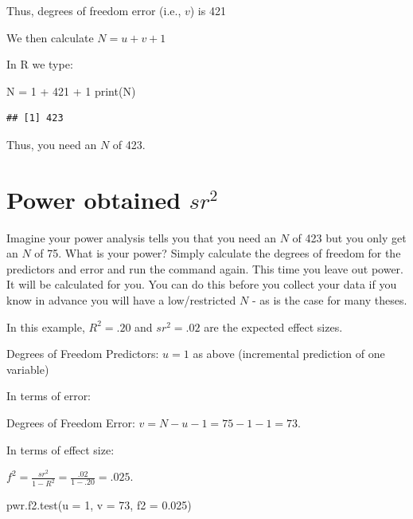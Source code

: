 \documentclass[
]{krantz}
\makeatletter
\newenvironment{Shaded}{\begin{snugshade}}{\end{snugshade}}
\newcommand{\AttributeTok}[1]{\textcolor[rgb]{0.61,0.61,0.61}{#1}}
\newcommand{\DecValTok}[1]{\textcolor[rgb]{0.06,0.06,0.06}{#1}}
\newcommand{\FloatTok}[1]{\textcolor[rgb]{0.06,0.06,0.06}{#1}}
\newcommand{\FunctionTok}[1]{\textcolor[rgb]{0,0,0}{#1}}
\newcommand{\NormalTok}[1]{#1}
\newcommand{\OtherTok}[1]{\textcolor[rgb]{0.37,0.37,0.37}{#1}}
\newcommand{\SpecialCharTok}[1]{\textcolor[rgb]{0,0,0}{#1}}
\newenvironment{kframe}{%
\medskip{}
\setlength{\fboxsep}{.8em}
 \def\at@end@of@kframe{}%
 \ifinner\ifhmode%
  \def\at@end@of@kframe{\end{minipage}}%
  \begin{minipage}{\columnwidth}%
 \fi\fi%
 \def\FrameCommand##1{\hskip\@totalleftmargin \hskip-\fboxsep
 \colorbox{shadecolor}{##1}\hskip-\fboxsep
     \hskip-\linewidth \hskip-\@totalleftmargin \hskip\columnwidth}%
 \MakeFramed {\advance\hsize-\width
   \@totalleftmargin\z@ \linewidth\hsize
   \@setminipage}}%
 {\par\unskip\endMakeFramed%
 \at@end@of@kframe}
\renewenvironment{Shaded}{\begin{kframe}}{\end{kframe}}
\makeatother
\begin{document}
Thus, degrees of freedom error (i.e., \(v\)) is 421

We then calculate \(N = u + v + 1\)

In R we type:

\begin{Shaded}
\begin{Highlighting}[]
\NormalTok{N }\OtherTok{=} \DecValTok{1} \SpecialCharTok{+} \DecValTok{421} \SpecialCharTok{+} \DecValTok{1}
\FunctionTok{print}\NormalTok{(N)}
\end{Highlighting}
\end{Shaded}

\begin{verbatim}
## [1] 423
\end{verbatim}

Thus, you need an \(N\) of 423.

\hypertarget{power-obtained-sr2}{%
\section{\texorpdfstring{Power obtained \(sr^2\)}{Power obtained sr\^{}2}}\label{power-obtained-sr2}}

Imagine your power analysis tells you that you need an \(N\) of 423 but you only get an \(N\) of 75. What is your power? Simply calculate the degrees of freedom for the predictors and error and run the command again. This time you leave out power. It will be calculated for you. You can do this before you collect your data if you know in advance you will have a low/restricted \(N\) - as is the case for many theses.

In this example, \(R^2=.20\) and \(sr^2=.02\) are the expected effect sizes.

Degrees of Freedom Predictors: \(u = 1\) as above (incremental prediction of one variable)

In terms of error:

Degrees of Freedom Error: \(v = N - u - 1 = 75 - 1 - 1 = 73\).

In terms of effect size:

\(f^2=\frac{sr^2}{1-R^2} = \frac{.02}{1-.20}=.025\).

\begin{Shaded}
\begin{Highlighting}[]
\FunctionTok{pwr.f2.test}\NormalTok{(}\AttributeTok{u =} \DecValTok{1}\NormalTok{,}
            \AttributeTok{v =} \DecValTok{73}\NormalTok{,}
            \AttributeTok{f2 =} \FloatTok{0.025}\NormalTok{)}
\end{Highlighting}
\end{Shaded}
\end{document}
